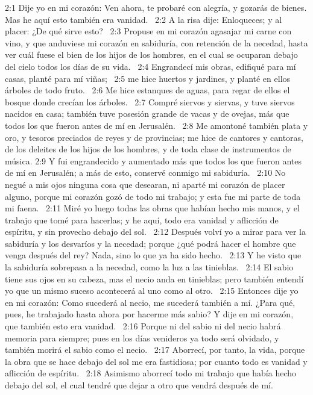 2:1 Dije yo en mi corazón: Ven ahora, te probaré con alegría, y gozarás de bienes. Mas he aquí esto también era vanidad.  
2:2 A la risa dije: Enloqueces; y al placer: ¿De qué sirve esto?  
2:3 Propuse en mi corazón agasajar mi carne con vino, y que anduviese mi corazón en sabiduría, con retención de la necedad, hasta ver cuál fuese el bien de los hijos de los hombres, en el cual se ocuparan debajo del cielo todos los días de su vida.  
2:4 Engrandecí mis obras, edifiqué para mí casas, planté para mí viñas;  
2:5 me hice huertos y jardines, y planté en ellos árboles de todo fruto.  
2:6 Me hice estanques de aguas, para regar de ellos el bosque donde crecían los árboles.  
2:7 Compré siervos y siervas, y tuve siervos nacidos en casa; también tuve posesión grande de vacas y de ovejas, más que todos los que fueron antes de mí en Jerusalén.  
2:8 Me amontoné también plata y oro, y tesoros preciados de reyes y de provincias; me hice de cantores y cantoras, de los deleites de los hijos de los hombres, y de toda clase de instrumentos de música. 
2:9 Y fui engrandecido y aumentado más que todos los que fueron antes de mí en Jerusalén; a más de esto, conservé conmigo mi sabiduría.  
2:10 No negué a mis ojos ninguna cosa que desearan, ni aparté mi corazón de placer alguno, porque mi corazón gozó de todo mi trabajo; y esta fue mi parte de toda mi faena.  
2:11 Miré yo luego todas las obras que habían hecho mis manos, y el trabajo que tomé para hacerlas; y he aquí, todo era vanidad y aflicción de espíritu, y sin provecho debajo del sol.  
2:12 Después volví yo a mirar para ver la sabiduría y los desvaríos y la necedad; porque ¿qué podrá hacer el hombre que venga después del rey? Nada, sino lo que ya ha sido hecho.  
2:13 Y he visto que la sabiduría sobrepasa a la necedad, como la luz a las tinieblas.  
2:14 El sabio tiene sus ojos en su cabeza, mas el necio anda en tinieblas; pero también entendí yo que un mismo suceso acontecerá al uno como al otro.  
2:15 Entonces dije yo en mi corazón: Como sucederá al necio, me sucederá también a mí. ¿Para qué, pues, he trabajado hasta ahora por hacerme más sabio? Y dije en mi corazón, que también esto era vanidad.  
2:16 Porque ni del sabio ni del necio habrá memoria para siempre; pues en los días venideros ya todo será olvidado, y también morirá el sabio como el necio.  
2:17 Aborrecí, por tanto, la vida, porque la obra que se hace debajo del sol me era fastidiosa; por cuanto todo es vanidad y aflicción de espíritu.  
2:18 Asimismo aborrecí todo mi trabajo que había hecho debajo del sol, el cual tendré que dejar a otro que vendrá después de mí.  
